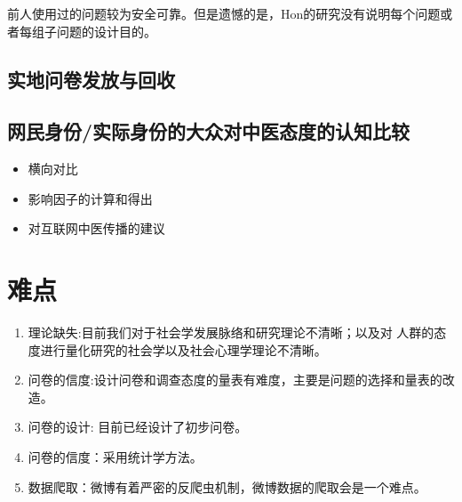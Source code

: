 \documentclass{ctexart}
\begin{document}
前人使用过的问题较为安全可靠。但是遗憾的是，Hon的研究没有说明每个问题或者每组子问题的设计目的。



\subsection{实地问卷发放与回收}
\subsection{网民身份/实际身份的大众对中医态度的认知比较}

\begin{itemize}
	\item 横向对比
	\item 影响因子的计算和得出
	\item 对互联网中医传播的建议
\end{itemize}


\section{难点}

\begin{enumerate}
	\item 理论缺失:目前我们对于社会学发展脉络和研究理论不清晰；以及对
	人群的态度进行量化研究的社会学以及社会心理学理论不清晰。
	\item 问卷的信度:设计问卷和调查态度的量表有难度，主要是问题的选择和量表的改造。
	\item 问卷的设计: 目前已经设计了初步问卷。
	\item 问卷的信度：采用统计学方法。
	\item 数据爬取：微博有着严密的反爬虫机制，微博数据的爬取会是一个难点。
\end{enumerate}


\end{document}
